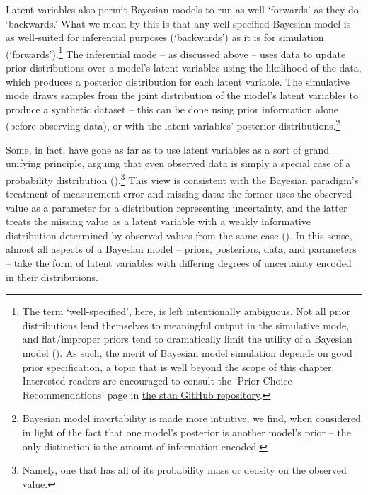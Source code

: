 \documentclass[
  12pt,
  a4paper,
  DIV=11,
  numbers=noendperiod,
  twoside,
  open=any]{scrartcl}
\begin{document}
Latent variables also permit Bayesian models to run as well `forwards'
as they do `backwards.' What we mean by this is that any well-specified
Bayesian model is as well-suited for inferential purposes (`backwards')
as it is for simulation (`forwards').\footnote{The term
  `well-specified', here, is left intentionally ambiguous. Not all prior
  distributions lend themselves to meaningful output in the simulative
  mode, and flat/improper priors tend to dramatically limit the utility
  of a Bayesian model (). As such, the merit of Bayesian model simulation depends on
  good prior specification, a topic that is well beyond the scope of
  this chapter. Interested readers are encouraged to consult the `Prior
  Choice Recommendations' page in
  \href{https://github.com/stan-dev/stan/wiki/Prior-Choice-Recommendations}{the
  stan GitHub repository}.} The inferential mode -- as discussed above
-- uses data to update prior distributions over a model's latent
variables using the likelihood of the data, which produces a posterior
distribution for each latent variable. The simulative mode draws samples
from the joint distribution of the model's latent variables to produce a
synthetic dataset -- this can be done using prior information alone
(before observing data), or with the latent variables' posterior
distributions.\footnote{Bayesian model invertability is made more
  intuitive, we find, when considered in light of the fact that one
  model's posterior is another model's prior -- the only distinction is
  the amount of information encoded.}

Some, in fact, have gone as far as to use latent variables as a sort of
grand unifying principle, arguing that even observed data is simply a
special case of a probability distribution
().\footnote{Namely,
  one that has all of its probability mass or density on the observed
  value.} This view is consistent with the Bayesian paradigm's treatment
of measurement error and missing data: the former uses the observed
value as a parameter for a distribution representing uncertainty, and
the latter treats the missing value as a latent variable with a weakly
informative distribution determined by observed values from the same
case (). In this
sense, almost all aspects of a Bayesian model -- priors, posteriors,
data, and parameters -- take the form of latent variables with differing
degrees of uncertainty encoded in their distributions.
\end{document}
